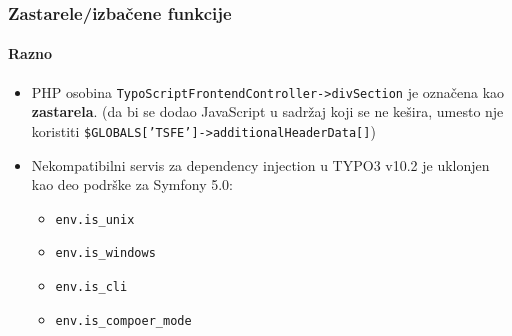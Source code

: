 
\begin{frame}[fragile]
	\frametitle{Zastarele/izbačene funkcije}
	\framesubtitle{Razno}

	\lstset{basicstyle=\tiny\ttfamily}

	\begin{itemize}

		\item PHP osobina \texttt{TypoScriptFrontendController->divSection} je označena kao \textbf{zastarela}.\newline
			\smaller
				(da bi se dodao JavaScript u sadržaj koji se ne kešira, umesto nje koristiti \texttt{\$GLOBALS['TSFE']->additionalHeaderData[]})
			\normalsize

		\item Nekompatibilni servis za dependency injection u TYPO3 v10.2 je uklonjen kao deo podrške za Symfony 5.0:

			\begin{itemize}
				\item \texttt{env.is\_unix}
				\item \texttt{env.is\_windows}
				\item \texttt{env.is\_cli}
				\item \texttt{env.is\_compoer\_mode}
			\end{itemize}

	\end{itemize}

\end{frame}

